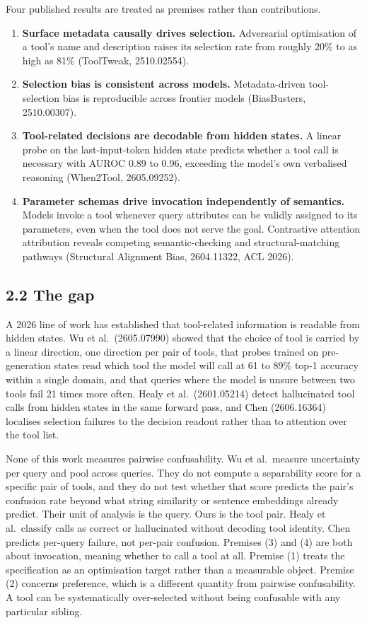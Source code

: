 \documentclass[11pt,a4paper]{article}
\begin{document}
Four published results are treated as premises rather than contributions.

\begin{enumerate}
    \item \textbf{Surface metadata causally drives selection.} Adversarial optimisation of a tool's name and
    description raises its selection rate from roughly 20\% to as high as 81\% (ToolTweak,
    2510.02554).
    \item \textbf{Selection bias is consistent across models.} Metadata-driven tool-selection bias is
    reproducible across frontier models (BiasBusters, 2510.00307).
    \item \textbf{Tool-related decisions are decodable from hidden states.} A linear probe on the
    last-input-token hidden state predicts whether a tool call is necessary with AUROC 0.89 to
    0.96, exceeding the model's own verbalised reasoning (When2Tool, 2605.09252).
    \item \textbf{Parameter schemas drive invocation independently of semantics.} Models invoke a tool
    whenever query attributes can be validly assigned to its parameters, even when the tool does
    not serve the goal. Contrastive attention attribution reveals competing semantic-checking and
    structural-matching pathways (Structural Alignment Bias, 2604.11322, ACL 2026).
\end{enumerate}

\subsection*{2.2 The gap}

A 2026 line of work has established that tool-related information is readable from hidden states.
Wu et al.\ (2605.07990) showed that the choice of tool is carried by a linear direction, one
direction per pair of tools, that probes trained on pre-generation states read which tool the
model will call at 61 to 89\% top-1 accuracy within a single domain, and that queries where the
model is unsure between two tools fail 21 times more often. Healy et al.\ (2601.05214) detect
hallucinated tool calls from hidden states in the same forward pass, and Chen (2606.16364)
localises selection failures to the decision readout rather than to attention over the tool list.

None of this work measures pairwise confusability. Wu et al.\ measure uncertainty per query and
pool across queries. They do not compute a separability score for a specific pair of tools, and
they do not test whether that score predicts the pair's confusion rate beyond what string
similarity or sentence embeddings already predict. Their unit of analysis is the query. Ours is
the tool pair. Healy et al.\ classify calls as correct or hallucinated without decoding tool
identity. Chen predicts per-query failure, not per-pair confusion. Premises (3) and (4) are both
about invocation, meaning whether to call a tool at all. Premise (1) treats the specification as
an optimisation target rather than a measurable object. Premise (2) concerns preference, which is
a different quantity from pairwise confusability. A tool can be systematically over-selected
without being confusable with any particular sibling.
\end{document}
